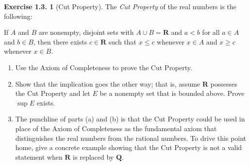\documentclass[12pt]{article}
\theoremstyle{definition}
\theoremstyle{exercise}
\newtheorem{exercise}{Exercise 1.3.}
\theoremstyle{solution}
\begin{document}
\begin{exercise}[Cut Property]
\label{ex:10}
    The \textit{Cut Property} of the real numbers is the following:

    If \( A \) and \( B \) are nonempty, disjoint sets with \( A \cup B = \mathbf{R} \) and \( a < b \) for all \( a \in A \) and \( b \in B \), then there exists \( c \in \mathbf{R} \) such that \( x \leq c \) whenever \( x \in A \) and \( x \geq c \) whenever \( x \in B \).
    \begin{enumerate}
        \item Use the Axiom of Completeness to prove the Cut Property.

        \item Show that the implication goes the other way; that is, assume \( \mathbf{R} \) possesses the Cut Property and let \( E \) be a nonempty set that is bounded above. Prove \( \sup E \) exists.

        \item The punchline of parts (a) and (b) is that the Cut Property could be used in place of the Axiom of Completeness as the fundamental axiom that distinguishes the real numbers from the rational numbers. To drive this point home, give a concrete example showing that the Cut Property is not a valid statement when \( \mathbf{R} \) is replaced by \( \mathbf{Q} \).
    \end{enumerate}
\end{exercise}
\end{document}
